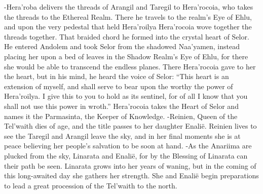 \documentclass[smalldemyvopaper,11pt,twoside,onecolumn,openright,extrafontsizes]{memoir}
\begin{document}
-Hera’roba delivers the threads of Arangil and Taregil to Hera’rocoia, who takes the threads to the Ethereal Realm. There he travels to the realm’s Eye of Ehlu, and upon the very pedestal that held Hera’roilya Hera’rocoia wove together the threads together. That braided chord he formed into the crystal heart of Selor. He entered Andolem and took Selor from the shadowed Naa’yamen, instead placing her upon a bed of leaves in the Shadow Realm’s Eye of Ehlu, for there she would be able to transcend the endless planes. There Hera’rocoia gave to her the heart, but in his mind, he heard the voice of Selor: “This heart is an extension of myself, and shall serve to bear upon the worthy the power of Hera’roilya. I give this to you to hold as its sentinel, for of all I know that you shall not use this power in wroth.” Hera’rocoia takes the Heart of Selor and names it the Parmasinta, the Keeper of Knowledge.
-Reinien, Queen of the Tel’waith dies of age, and the title passes to her daughter Enalië. Reinien lives to see the Taregil and Arangil leave the sky, and in her final moments she is at peace believing her people’s salvation to be soon at hand.
-As the Anariima are plucked from the sky, Linarata and Enalië, for by the Blessing of Linarata can their path be seen. Linarata grows into her years of waning, but in the coming of this long-awaited day she gathers her strength. She and Enalië begin preparations to lead a great procession of the Tel’waith to the north.
\end{document}
